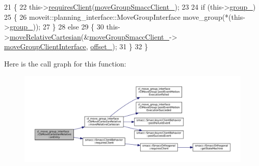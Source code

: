 \begin{DoxyCode}
21 \{
22   this->\hyperlink{classsmacc_1_1ISmaccClientBehavior_a32b16e99e3b4cb289414203dc861a440}{requiresClient}(\hyperlink{classcl__move__group__interface_1_1CbMoveCartesianRelative_ac0226b2db9bf4de86eb64a535457e295}{moveGroupSmaccClient\_});
23 
24   \textcolor{keywordflow}{if} (this->\hyperlink{classcl__move__group__interface_1_1CbMoveCartesianRelative_a194d8357267ccd5ee0a10200f1c4cae0}{group\_})
25   \{
26       moveit::planning\_interface::MoveGroupInterface move\_group(*(this->\hyperlink{classcl__move__group__interface_1_1CbMoveCartesianRelative_a194d8357267ccd5ee0a10200f1c4cae0}{group\_}));
27   \}
28   \textcolor{keywordflow}{else}
29   \{
30       this->\hyperlink{classcl__move__group__interface_1_1CbMoveCartesianRelative_ae8443c7f81affe5c4450e83fc665487f}{moveRelativeCartesian}(&\hyperlink{classcl__move__group__interface_1_1CbMoveCartesianRelative_ac0226b2db9bf4de86eb64a535457e295}{moveGroupSmaccClient\_}->
      \hyperlink{classcl__move__group__interface_1_1ClMoveGroup_a92922ea689e4e1b7b91512c56629c95b}{moveGroupClientInterface}, \hyperlink{classcl__move__group__interface_1_1CbMoveCartesianRelative_aac5b6c2f42406da43f94cd5334aca925}{offset\_});
31   \}
32 \}
\end{DoxyCode}
Here is the call graph for this function\+:
\nopagebreak
\begin{figure}[H]
\begin{center}
\leavevmode
\includegraphics[width=350pt]{classcl__move__group__interface_1_1CbMoveCartesianRelative_a7d65e3d5fa3f2c7b47d9cbe631f448ad_cgraph}
\end{center}
\end{figure}
\mbox{\label{classcl__move__group__interface_1_1CbMoveCartesianRelative_a4ec79f1b62ddd8ecabf1f63aabb69013}} 
